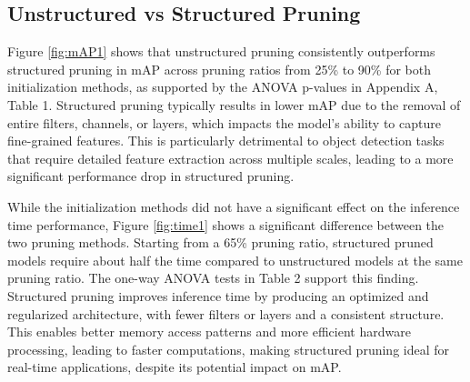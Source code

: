 \documentclass[10pt]{cai}
\begin{document}
\subsection{Unstructured vs Structured Pruning}
\label{sec2}
Figure \ref{fig:mAP1} shows that unstructured pruning consistently outperforms structured pruning in mAP across pruning ratios from 25\% to 90\% for both initialization methods, as supported by the ANOVA p-values in Appendix A, Table 1. Structured pruning typically results in lower mAP due to the removal of entire filters, channels, or layers, which impacts the model’s ability to capture fine-grained features. This is particularly detrimental to object detection tasks that require detailed feature extraction across multiple scales, leading to a more significant performance drop in structured pruning.

While the initialization methods did not have a significant effect on the inference time performance, Figure \ref{fig:time1} shows a significant difference between the two pruning methods. Starting from a 65\% pruning ratio, structured pruned models require about half the time compared to unstructured models at the same pruning ratio. The one-way ANOVA tests in Table 2 support this finding. Structured pruning improves inference time by producing an optimized and regularized architecture, with fewer filters or layers and a consistent structure. This enables better memory access patterns and more efficient hardware processing, leading to faster computations, making structured pruning ideal for real-time applications, despite its potential impact on mAP.
\end{document}
